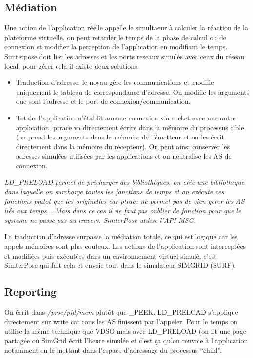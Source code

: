 \documentclass{article}
\begin{document}
\subsection{Médiation}
Une action de l'application réelle appelle le simultaeur à calculer la
réaction de la plateforme virtuelle, on peut retarder le temps de la
phase de calcul ou de connexion et modifier la perception de
l'application en modifiant le temps. Simterpose doit lier les adresses
et les ports reseaux simulés avec ceux du réseau local, pour gérer
cela il existe deux solutions:
\begin{itemize}
\item Traduction d'adresse: le noyau gère les communications et
  modifie uniquement le tableau de correspondance d'adresse. On
  modifie les arguments que sont l'adresse et le port de
  connexion/communication.
\item Totale: l'application n'établit aucune connexion via socket avec
  une autre application, ptrace va directement écrire dans la mémoire
  du processus cible (on prend les arguments dans la mémoire de
  l'émetteur et on les écrit directement dans la mémoire du
  récepteur). On peut ainsi conserver les adresses simulées utilisées
  par les applications et on neutralise les AS de connexion.
\end{itemize}

\textit{LD\_PRELOAD permet de précharger des bibliothèques, on crée
  une bibliothèque dans laquelle on surcharge toutes les fonctions de
  temps et on exécute ces fonctions plutot que les originelles car
  ptrace ne permet pas de bien gérer les AS liés aux temps... Mais
  dans ce cas il ne faut pas oublier de fonction pour que le système
  ne passe pas au travers. SimterPose utilise l'API MSG.}

La traduction d'adresse surpasse la médiation totale, ce qui est
logique car les appels mémoires sont plus couteux. Les actions de
l'application sont interceptées et modifiées puis exécutées dans un
environnement virtuel simulé, c'est SimterPose qui fait cela et envoie
tout dans le simulateur SIMGRID (SURF).

\subsection{Reporting}
On écrit dans \textit{/proc/pid/mem} plutôt que \_PEEK. LD\_PRELOAD
s'applique directement sur write car tous les AS finissent par
l'appeler. Pour le temps on utilise la même technique que VDSO mais
avec LD\_PRELOAD (on lit une page partagée où SimGrid écrit l'heure
simulée et c'est ça qu'on renvoie à l'application notamment en le
mettant dans l'espace d'adressage du processus ``child''.
\end{document}
